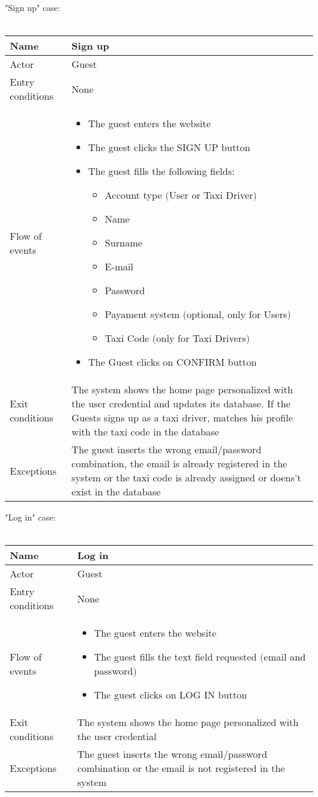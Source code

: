 \newpage
"Sign up" case:
\\
\\
\begin{tabular}{|p{3cm}|p{10cm}|} 
\hline
Name & Sign up\\
\hline
Actor & Guest\\
\hline
Entry conditions & None\\
\hline
Flow of events & 
	\begin{itemize}
		\item The guest enters the website
		\item The guest clicks the SIGN UP button
		\item The guest fills the following fields:
		\begin{itemize}
			\item Account type $($User or Taxi Driver$)$
			\item Name
			\item Surname
			\item E-mail
			\item Password
			\item Payament system $($optional, only for Users$)$
			\item Taxi Code $($only for Taxi Drivers$)$
		\end{itemize}
		\item The Guest clicks on CONFIRM button
	\end{itemize}\\
\hline
Exit conditions & The system shows the home page personalized with the user credential and updates its database. If the Guests signs up as a taxi driver, matches his profile with the taxi code in the database\\
\hline
Exceptions & The guest inserts the wrong email/password combination, the email is already registered in the system or the taxi code is already assigned or doens't exist in the database\\
\hline
\end {tabular}



\newpage
"Log in" case:
\\
\\
\begin{tabular}{|p{3cm}|p{10cm}|} 
\hline
Name & Log in\\
\hline
Actor & Guest\\
\hline
Entry conditions & None\\
\hline
Flow of events & \begin{itemize}
					\item The guest enters the website
					\item The guest fills the text field requested $($email and password$)$
					\item The guest clicks on LOG IN button
				\end{itemize}\\
\hline
Exit conditions & The system shows the home page personalized with the user credential\\
\hline
Exceptions & The guest inserts the wrong email/password combination or the email is not registered in the system\\
\hline
\end {tabular}


